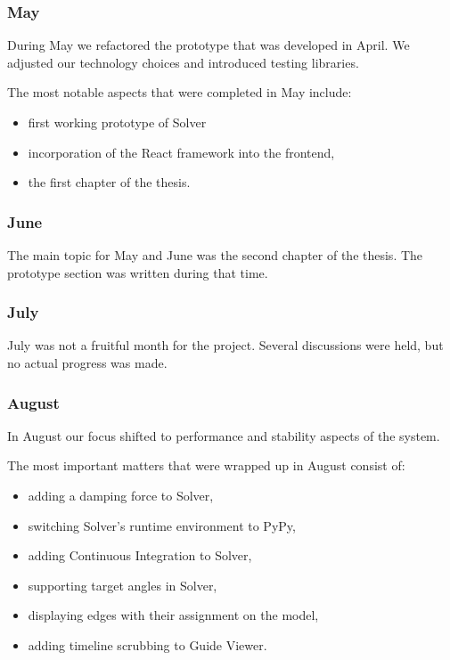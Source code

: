 
\subsubsection{May}

During May we refactored the prototype that was developed in April. We adjusted our technology choices and introduced testing libraries.

The most notable aspects that were completed in May include:

\begin{itemize}
	\item first working prototype of Solver
	\item incorporation of the React framework into the frontend,
	\item the first chapter of the thesis. 
\end{itemize}

\subsubsection{June}

The main topic for May and June was the second chapter of the thesis. The prototype section was written during that time.

\subsubsection{July}

July was not a fruitful month for the project. Several discussions were held, but no actual progress was made.

\subsubsection{August}

In August our focus shifted to performance and stability aspects of the system. 

The most important matters that were wrapped up in August consist of:

\begin{itemize}
	\item adding a damping force to Solver,
	\item switching Solver's runtime environment to PyPy,
	\item adding Continuous Integration to Solver,
	\item supporting target angles in Solver,
	\item displaying edges with their assignment on the model,
	\item adding timeline scrubbing to Guide Viewer.
\end{itemize}

